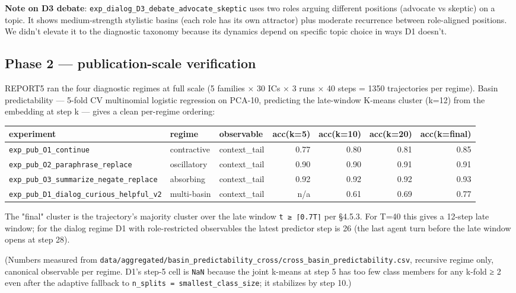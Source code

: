 \documentclass{article}
\theoremstyle{plain}
\theoremstyle{definition}
\begin{document}
\textbf{Note on D3 debate}: \texttt{exp\_dialog\_D3\_debate\_advocate\_skeptic} uses two
roles arguing different positions (advocate vs skeptic) on a topic. It
shows medium-strength stylistic basins (each role has its own attractor)
plus moderate recurrence between role-aligned positions. We didn't
elevate it to the diagnostic taxonomy because its dynamics depend on
specific topic choice in ways D1 doesn't.

\subsection{Phase 2 — publication-scale verification}

REPORT5 ran the four diagnostic regimes at full scale (5 families ×
30 ICs × 3 runs × 40 steps = 1350 trajectories per regime). Basin
predictability — 5-fold CV multinomial logistic regression on PCA-10,
predicting the late-window K-means cluster (k=12) from the embedding
at step k — gives a clean per-regime ordering:

\begin{table}[h!]
\centering
\small
\begin{tabular}{lllrrrr}
\toprule
experiment & regime & observable & acc(k=5) & acc(k=10) & acc(k=20) & acc(k=final) \\
\midrule
\texttt{exp\_pub\_O1\_continue} & contractive & context\_tail & 0.77 & 0.80 & 0.81 & 0.85 \\
\texttt{exp\_pub\_O2\_paraphrase\_replace} & oscillatory & context\_tail & 0.90 & 0.90 & 0.91 & 0.91 \\
\texttt{exp\_pub\_O3\_summarize\_negate\_replace} & absorbing & context\_tail & 0.92 & 0.92 & 0.92 & 0.93 \\
\texttt{exp\_pub\_D1\_dialog\_curious\_helpful\_v2} & multi-basin & context\_tail & n/a & 0.61 & 0.69 & 0.77 \\
\bottomrule
\end{tabular}
\end{table}

The "final" cluster is the trajectory's majority cluster over the
late window \texttt{t ≥ ⌈0.7T⌉} per §4.5.3. For T=40 this gives a 12-step
late window; for the dialog regime D1 with role-restricted observables
the latest predictor step is 26 (the last agent turn before the late
window opens at step 28).

(Numbers measured from
\texttt{data/aggregated/basin\_predictability\_cross/cross\_basin\_predictability.csv},
recursive regime only, canonical observable per regime. D1's step-5
cell is \texttt{NaN} because the joint k-means at step 5 has too few class
members for any k-fold ≥ 2 even after the adaptive fallback to
\texttt{n\_splits = smallest\_class\_size}; it stabilizes by step 10.)
\end{document}

